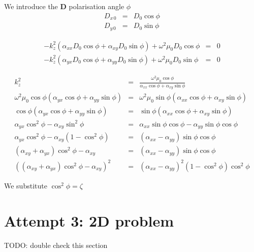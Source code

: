 \documentclass[12pt,a4paper,twoside,openright,BCOR10mm,headsepline,titlepage,abstracton,chapterprefix,final]{scrreprt}
\newcommand\Vector[1]{{\mathbf{#1}}}
\newcommand\wavenumber{k}
\newcommand\scalarDfield{D}
\newcommand\Dfield{\Vector{\scalarDfield}}
\begin{document}
We introduce the $\Dfield$ polarisation angle $\phi$
\begin{eqnarray}
 \scalarDfield_{x\,0} &=& \scalarDfield_{0} \cos \phi \\
 \scalarDfield_{y\,0} &=& \scalarDfield_{0} \sin \phi
\end{eqnarray}

\begin{eqnarray}
 - \wavenumber_z^2 (\alpha_{xx} \scalarDfield_{0} \cos \phi + \alpha_{xy} \scalarDfield_{0} \sin \phi) + \omega^2 \mu_0 \scalarDfield_{0} \cos \phi &=& 0\\ 
 - \wavenumber_z^2 (\alpha_{yx} \scalarDfield_{0} \cos \phi + \alpha_{yy} \scalarDfield_{0} \sin \phi) + \omega^2 \mu_0 \scalarDfield_{0} \sin \phi &=& 0
\end{eqnarray}

\begin{eqnarray}
 \wavenumber_z^2 &=& \frac{ \omega^2 \mu_0 \cos \phi}{\alpha_{xx} \cos \phi + \alpha_{xy} \sin \phi}\\ 
 \omega^2 \mu_0 \cos \phi (\alpha_{yx} \cos \phi + \alpha_{yy} \sin \phi) &=& \omega^2 \mu_0 \sin \phi (\alpha_{xx} \cos \phi + \alpha_{xy} \sin \phi) \\
 \cos \phi (\alpha_{yx} \cos \phi + \alpha_{yy} \sin \phi) &=& \sin \phi (\alpha_{xx} \cos \phi + \alpha_{xy} \sin \phi) \\
 \alpha_{yx} \cos^2 \phi - \alpha_{xy} \sin^2 \phi &=& \alpha_{xx} \sin \phi \cos \phi - \alpha_{yy} \sin \phi \cos \phi \\
 \alpha_{yx} \cos^2 \phi - \alpha_{xy} ( 1- \cos^2 \phi ) &=& ( \alpha_{xx} - \alpha_{yy} ) \sin \phi \cos \phi \\
 ( \alpha_{xy} + \alpha_{yx} ) \cos^2 \phi - \alpha_{xy} &=& ( \alpha_{xx} - \alpha_{yy} ) \sin \phi \cos \phi \\
 \left( ( \alpha_{xy} + \alpha_{yx} ) \cos^2 \phi - \alpha_{xy}\right)^2 &=& ( \alpha_{xx} - \alpha_{yy} )^2 (1- \cos^2 \phi) \cos^2 \phi
\end{eqnarray}

We substitute $\cos^2 \phi = \zeta$





\section{Attempt 3: 2D problem}
TODO: double check this section
\end{document}
